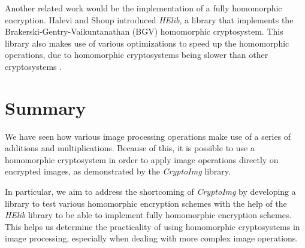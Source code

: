 Another related work would be the implementation of a fully homomorphic encryption. Halevi and Shoup \cite{garay_algorithms_2014} introduced \textit{HElib}, a library that implements the Brakerski-Gentry-Vaikuntanathan (BGV) homomorphic cryptosystem. This library also makes use of various optimizations to speed up the homomorphic operations, due to homomorphic cryptosystems being slower than other cryptosystems \cite{sen_homomorphic_2013}.


\section{Summary}
We have seen how various image processing operations make use of a series of additions and multiplications. Because of this, it is possible to use a homomorphic cryptosystem in order to apply image operations directly on encrypted images, as demonstrated by the \textit{CryptoImg} library.

In particular, we aim to address the shortcoming of \textit{CryptoImg} by developing a library to test various homomorphic encryption schemes with the help of the \textit{HElib} library to be able to implement fully homomorphic encryption schemes. This helps us determine the practicality of using homomorphic cryptosystems in image processing, especially when dealing with more complex image operations.
